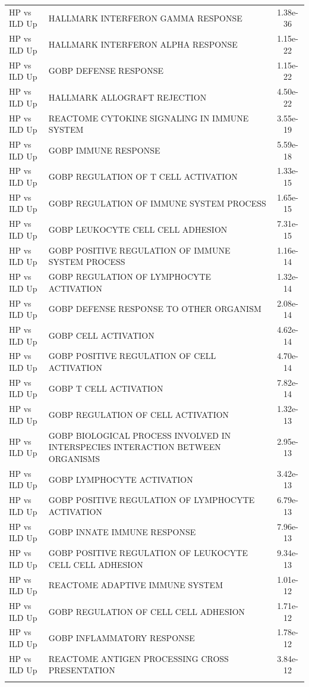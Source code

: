 \documentclass[
]{article}
\begin{document}
\begin{singlespace}
\begin{longtable}[t]{>{\raggedright\arraybackslash}p{1.0in}>{\raggedright\arraybackslash}p{4.5in}c}
\endfoot
\bottomrule
\endlastfoot
HP vs ILD Up & HALLMARK INTERFERON GAMMA RESPONSE & 1.38e-36\\
HP vs ILD Up & HALLMARK INTERFERON ALPHA RESPONSE & 1.15e-22\\
HP vs ILD Up & GOBP DEFENSE RESPONSE & 1.15e-22\\
HP vs ILD Up & HALLMARK ALLOGRAFT REJECTION & 4.50e-22\\
HP vs ILD Up & REACTOME CYTOKINE SIGNALING IN IMMUNE SYSTEM & 3.55e-19\\
\addlinespace
HP vs ILD Up & GOBP IMMUNE RESPONSE & 5.59e-18\\
HP vs ILD Up & GOBP REGULATION OF T CELL ACTIVATION & 1.33e-15\\
HP vs ILD Up & GOBP REGULATION OF IMMUNE SYSTEM PROCESS & 1.65e-15\\
HP vs ILD Up & GOBP LEUKOCYTE CELL CELL ADHESION & 7.31e-15\\
HP vs ILD Up & GOBP POSITIVE REGULATION OF IMMUNE SYSTEM PROCESS & 1.16e-14\\
\addlinespace
HP vs ILD Up & GOBP REGULATION OF LYMPHOCYTE ACTIVATION & 1.32e-14\\
HP vs ILD Up & GOBP DEFENSE RESPONSE TO OTHER ORGANISM & 2.08e-14\\
HP vs ILD Up & GOBP CELL ACTIVATION & 4.62e-14\\
HP vs ILD Up & GOBP POSITIVE REGULATION OF CELL ACTIVATION & 4.70e-14\\
HP vs ILD Up & GOBP T CELL ACTIVATION & 7.82e-14\\
\addlinespace
HP vs ILD Up & GOBP REGULATION OF CELL ACTIVATION & 1.32e-13\\
HP vs ILD Up & GOBP BIOLOGICAL PROCESS INVOLVED IN INTERSPECIES INTERACTION BETWEEN ORGANISMS & 2.95e-13\\
HP vs ILD Up & GOBP LYMPHOCYTE ACTIVATION & 3.42e-13\\
HP vs ILD Up & GOBP POSITIVE REGULATION OF LYMPHOCYTE ACTIVATION & 6.79e-13\\
HP vs ILD Up & GOBP INNATE IMMUNE RESPONSE & 7.96e-13\\
\addlinespace
HP vs ILD Up & GOBP POSITIVE REGULATION OF LEUKOCYTE CELL CELL ADHESION & 9.34e-13\\
HP vs ILD Up & REACTOME ADAPTIVE IMMUNE SYSTEM & 1.01e-12\\
HP vs ILD Up & GOBP REGULATION OF CELL CELL ADHESION & 1.71e-12\\
HP vs ILD Up & GOBP INFLAMMATORY RESPONSE & 1.78e-12\\
HP vs ILD Up & REACTOME ANTIGEN PROCESSING CROSS PRESENTATION & 3.84e-12\\*
\end{longtable}
\endgroup{}




\end{singlespace}
\end{document}
